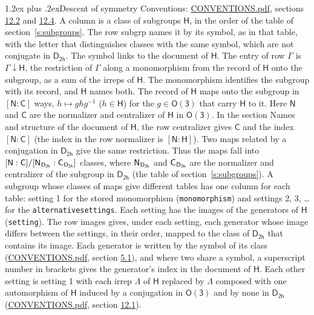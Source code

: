 \documentclass[10pt,a4paper]{article}
\makeatletter
\renewcommand\section{\@startsection{section}{1}{\z@}{-3ex plus -1ex minus -.2ex}%
  {1.2ex plus .2ex}{\normalfont\large\sffamily\bfseries\color{parttitle}}}
\numberwithin{equation}{section}
\newcommand{\grp}[1]{\mathsf{#1}}
\newcommand{\grpindex}[2]{[#1 : #2]}
\newcommand{\restr}[2]{#1\!\downarrow#2}
\newcommand{\hairsp}{\mkern1mu}
\makeatother
\begin{document}
\section{Descent of symmetry}\label{s:subduction}
Conventions: \href{../../CONVENTIONS.pdf}{CONVENTIONS.pdf}, sections \href{../../CONVENTIONS.pdf\#conv.12.2}{12.2} and \href{../../CONVENTIONS.pdf\#conv.12.4}{12.4}.
A column is a class of subgroups $\grp{H}$, in the order of the table of section~\ref{s:subgroups}. The row subgrp names it by its symbol, as in that table, with the letter that distinguishes classes with the same symbol, which are not conjugate in $\grp{D_{2h}}$. The symbol links to the document of $\grp{H}$. The entry of row $\Gamma$ is $\restr{\Gamma}{\grp{H}}$, the restriction of $\Gamma$ along a monomorphism from the record of $\grp{H}$ onto the subgroup, as a sum of the irreps of $\grp{H}$. The monomorphism identifies the subgroup with its record, and $\grp{H}$ names both. \label{n:group.normalizer.o3}\label{n:group.centralizer.o3}The record of $\grp{H}$ maps onto the subgroup in $\grpindex{\grp{N}}{\grp{C}}$ ways, $h \mapsto g h g^{-1}$ ($h \in \grp{H}$) for the $g \in \grp{O(3)}$ that carry $\grp{H}$ to it. Here $\grp{N}$ and $\grp{C}$ are the normalizer and centralizer of $\grp{H}$ in \href{O3.pdf}{$\grp{O(3)}$}. In the section Names and structure of the document of $\grp{H}$, the row centralizer gives $\grp{C}$ and the index $\grpindex{\grp{N}}{\grp{C}}$ (the index in the row normalizer is $\grpindex{\grp{N}}{\grp{H}}$). Two maps related by a conjugation in $\grp{D_{2h}}$ give the same restriction. Thus the maps fall into $\grpindex{\grp{N}}{\grp{C}}/\grpindex{\grp{N}_{\hairsp \grp{D_{2h}}}}{\grp{C}_{\hairsp \grp{D_{2h}}}}$ classes, where $\grp{N}_{\hairsp \grp{D_{2h}}}$ and $\grp{C}_{\hairsp \grp{D_{2h}}}$ are the normalizer and centralizer of the subgroup in $\grp{D_{2h}}$ (the table of section~\ref{s:subgroups}). \label{n:head.setting}A subgroup whose classes of maps give different tables has one column for each table: setting 1 for the stored monomorphism (\texttt{monomorphism}) and settings 2, 3, \dots{} for the \texttt{alternativesettings}. Each setting has the images of the generators of $\grp{H}$ (\texttt{setting}). \label{n:head.images}The row images gives, under each setting, each generator whose image differs between the settings, in their order, mapped to the class of $\grp{D_{2h}}$ that contains its image. \label{n:element.generator.index}Each generator is written by the symbol of its class (\href{../../CONVENTIONS.pdf}{CONVENTIONS.pdf}, section \href{../../CONVENTIONS.pdf\#conv.5.1}{5.1}), and where two share a symbol, a superscript number in brackets gives the generator's index in the document of $\grp{H}$. \label{n:irrep.Delta}Each other setting is setting 1 with each irrep $\Lambda$ of $\grp{H}$ replaced by $\Lambda$ composed with one automorphism of $\grp{H}$ induced by a conjugation in \href{O3.pdf}{$\grp{O(3)}$} and by none in $\grp{D_{2h}}$ (\href{../../CONVENTIONS.pdf}{CONVENTIONS.pdf}, section \href{../../CONVENTIONS.pdf\#conv.12.1}{12.1}).
\end{document}
